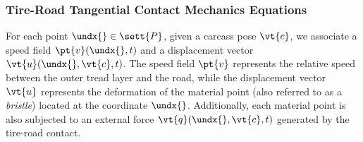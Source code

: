 \subsubsection{Tire-Road Tangential Contact Mechanics Equations}

For each point $\undx{} \in \sett{P}$, given a carcass pose $\vt{c}$, we associate a speed field $\pt{v}(\undx{}, t)$ and a displacement vector $\vt{u}(\undx{}, \vt{c}, t)$. The speed field $\pt{v}$ represents the relative speed between the outer tread layer and the road, while the displacement vector $\vt{u}$ represents the deformation of the material point (also referred to as a \emph{bristle}) located at the coordinate $\undx{}$. Additionally, each material point is also subjected to an external force $\vt{q}(\undx{}, \vt{c}, t)$ generated by the tire-road contact.

